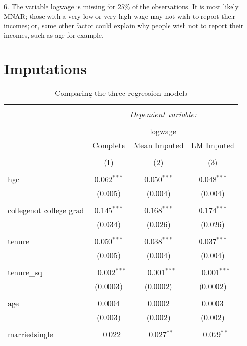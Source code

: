 \documentclass{article}
\begin{document}
6. The variable logwage is missing for 25\% of the observations. It is most likely MNAR; those with a very low or very high wage may not wish to report their incomes; or, some other factor could explain why people wish not to report their incomes, such as age for example. 
\clearpage

\section{Imputations}

\begin{table}[!htbp] \centering 
  \caption{Comparing the three regression models} 
  \label{} 
\begin{tabular}{@{\extracolsep{5pt}}lccc} 
\\[-1.8ex]\hline 
\hline \\[-1.8ex] 
 & \multicolumn{3}{c}{\textit{Dependent variable:}} \\ 
\cline{2-4} 
\\[-1.8ex] & \multicolumn{3}{c}{logwage} \\ 
 & Complete & Mean Imputed & LM Imputed \\
\\[-1.8ex] & (1) & (2) & (3)\\ 
\hline \\[-1.8ex] 
 hgc & 0.062$^{***}$ & 0.050$^{***}$ & 0.048$^{***}$ \\ 
  & (0.005) & (0.004) & (0.004) \\ 
  & & & \\ 
 collegenot college grad & 0.145$^{***}$ & 0.168$^{***}$ & 0.174$^{***}$ \\ 
  & (0.034) & (0.026) & (0.026) \\ 
  & & & \\ 
 tenure & 0.050$^{***}$ & 0.038$^{***}$ & 0.037$^{***}$ \\ 
  & (0.005) & (0.004) & (0.004) \\ 
  & & & \\ 
 tenure\_sq & $-$0.002$^{***}$ & $-$0.001$^{***}$ & $-$0.001$^{***}$ \\ 
  & (0.0003) & (0.0002) & (0.0002) \\ 
  & & & \\ 
 age & 0.0004 & 0.0002 & 0.0003 \\ 
  & (0.003) & (0.002) & (0.002) \\ 
  & & & \\ 
 marriedsingle & $-$0.022 & $-$0.027$^{**}$ & $-$0.029$^{**}$ \\ 

\end{tabular}
\end{table}
\end{document}

